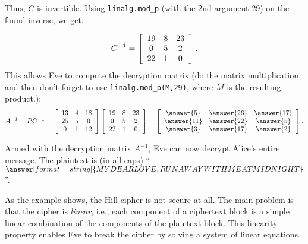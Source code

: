 \documentclass{ximera}
\begin{document}
\begin{example}
  Thus, $C$ is invertible. Using \texttt{linalg.mod\_p} (with the 2nd argument 29) on the found inverse, we get.
  
  \begin{equation*}
    C^{-1}
    =
    \startmat{ccc}
      19 & 8 & 23 \\
      0 & 5 & 2 \\
      22 & 1 & 0 \\
    \stopmat.
  \end{equation*}
  This allows Eve to compute the decryption matrix (do the matrix multiplication and then don't forget to use \texttt{linalg.mod\_p(M,29)}, where $M$ is the resulting product.):
  \begin{equation*}
    A^{-1}
    =
    PC^{-1}
    =
    \startmat{ccc}
      13 & 4 & 18 \\
      25 & 5 & 0 \\
      0 & 1 & 12 \\
    \stopmat
    \startmat{ccc}
      19 & 8 & 23 \\
      0 & 5 & 2 \\
      22 & 1 & 0 \\
    \stopmat
    =
    \startmat{ccc}
    \answer{5} & \answer{26} & \answer{17} \\
    \answer{11} & \answer{22} & \answer{5} \\
    \answer{3} & \answer{17} & \answer{2}
    \stopmat.
  \end{equation*}

  Armed with the decryption matrix $A^{-1}$, Eve can now decrypt
  Alice's entire message. The plaintext is (in all caps) ``$\answer[format=string]{MY DEAR LOVE, RUN AWAY WITH ME AT MIDNIGHT}$''.
\end{example}

As the example shows, the Hill cipher is not secure at all. The main
problem is that the cipher is {\em linear}, i.e., each component of a
ciphertext block is a simple linear combination of the components of
the plaintext block. This linearity property enables Eve to break the
cipher by solving a system of linear equations.
\end{document}
